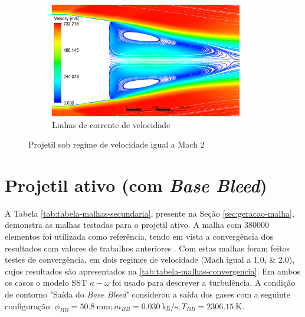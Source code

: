 \begin{figure}[!htpb]
    \hfill    
    \begin{subfigure}[b]{0.47\textwidth}
        \centering
        \includegraphics[height=5cm,width=\textwidth]{corrente-velocidade-off.png}
        \caption{Linhas de corrente de velocidade}
        \label{fig:corrente-velocidade-base-sembasebleed}    
    \end{subfigure}
	\caption{Projetil sob regime de velocidade igual a Mach \num{2}}
	\label{fig:contornos-pressao-velocidade-sembasebleed}
\end{figure}


\section{Projetil ativo (com \textit{Base Bleed})}\label{sec:resultados-com-basebleed}

A Tabela \ref{tab:tabela-malhas-secundaria}, presente na Seção \ref{sec:geracao-malha}, demonstra as malhas testadas para o projetil ativo. A malha com \num{380000} elementos foi utilizada como referência, tendo em vista a convergência dos resultados com valores de trabalhos anteriores \cite{Mahmoud2009}. Com estas malhas foram feitos testes de convergência, em dois regimes de velocidade (Mach igual a \numlist{1,0;2,0}), cujos resultados são apresentados na \autoref{tab:tabela-malhas-convergencia}. Em ambos os casos o modelo SST \(\kappa-\omega\) foi usado para descrever a turbulência. A condição de contorno "Saída do \textit{Base Bleed}"{} considerou a saída dos gases com a seguinte configuração: \(\phi_{BB} = \qty{50,8}{\milli\metre}; \Dot{m}_{BB} = \qty{0,030}{\kilogram\per\second}; T_{BB} = \qty{2306,15}{\kelvin}\).

